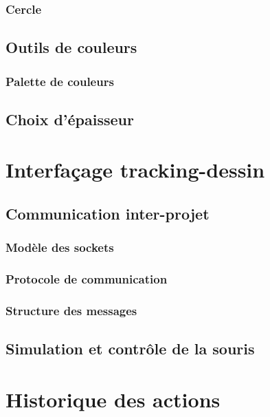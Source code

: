 \documentclass[11pt,a4paper,oldfontcommands]{memoir}
\begin{document}
\subsubsection{Cercle}

\subsection{Outils de couleurs}

\subsubsection{Palette de couleurs}

\subsection{Choix d'épaisseur}

\section{Interfaçage tracking-dessin}

\subsection{Communication inter-projet}

\subsubsection{Modèle des sockets}

\subsubsection{Protocole de communication}

\subsubsection{Structure des messages}

\subsection{Simulation et contrôle de la souris}

\section{Historique des actions}
\end{document}

